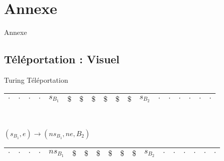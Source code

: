 \documentclass[12pt]{beamer}
\begin{document}
\section{Annexe}
\begin{frame}{Annexe}
    \tableofcontents[sections={<6>}]
\end{frame}

\subsection{Téléportation : Visuel}
\begin{frame}{Turing Téléportation}
\begin{center}
    

    \begin{tabular}{|c|c|c|c|c|c|c|c|c|c|c|c|c|c|c|c|c|c|}\hline
     $\cdot$ & $\cdot$ & $\cdot$ & $\cdot$ & $s_{B_1}$ & $\$$ & $\$$ & $\$$ & $\$$ & $\$$ & $\$$ & $s_{B_2}$ & $\cdot$ & $\cdot$ & $\cdot$ & $\cdot$ & $\cdot$ & $\cdot$ \\\hline    
\end{tabular}\\

        \pause

\vspace{0.5cm}

    $(s_{B_1},e) \longrightarrow (ns_{B_1}, ne, B_2)$\\
    

\begin{tabular}{|c|c|c|c|c|c|c|c|c|c|c|c|c|c|c|c|c|c|}\hline
     $\cdot$ & $\cdot$ & $\cdot$ & $\cdot$ & $ns_{B_1}$ & $\$$ & $\$$ & $\$$ & $\$$ & $\$$ & $\$$ & $s_{B_2}$ & $\cdot$ & $\cdot$ & $\cdot$ & $\cdot$ & $\cdot$ & $\cdot$ \\\hline    
     
\end{tabular}\\

    \end{center}
\end{frame}
\end{document}
